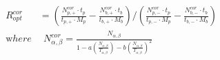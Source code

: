 


\begin{eqnarray*}
 & R_{opt}^{cor} & = \left( \frac{N_{p,+}^{cor} \cdot t_p} {t_{p,+} \cdot M_p} - 
                   \frac{N_{b,+}^{cor} \cdot t_b} {t_{b,+} \cdot M_b} \right)
            /
            \left( \frac{N_{p,-}^{cor} \cdot t_p} {t_{p,-} \cdot M_p} - 
                   \frac{N_{b,-}^{cor} \cdot t_b} {t_{b,-} \cdot M_b} \right)
\\
&{\mathrm where}& \ \ N_{\alpha,\beta}^{cor}  = \frac{N_{\alpha,\beta}}
    {1 - a\left( \frac{N_{\alpha,\beta}}{T_{\alpha,\beta}} \right) - b \left(
     \frac{N_{\alpha,\beta}}{T_{\alpha,\beta}}\right)^2}
\end{eqnarray*}

